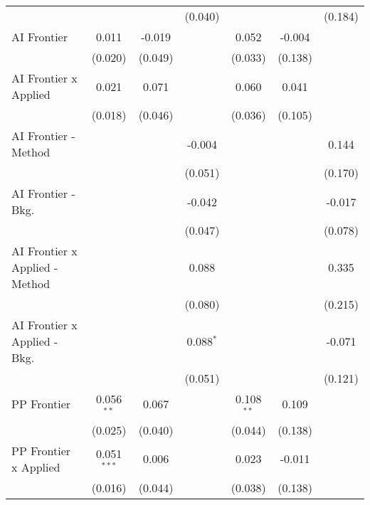 \begin{tabular}{lcccccc}
                                  &               &              & (0.040)     &              &         & (0.184)\\   
   AI Frontier                    & 0.011         & -0.019       &             & 0.052        & -0.004  &   \\   
                                  & (0.020)       & (0.049)      &             & (0.033)      & (0.138) &   \\   
   AI Frontier x Applied          & 0.021         & 0.071        &             & 0.060        & 0.041   &   \\   
                                  & (0.018)       & (0.046)      &             & (0.036)      & (0.105) &   \\   
   AI Frontier - Method           &               &              & -0.004      &              &         & 0.144\\   
                                  &               &              & (0.051)     &              &         & (0.170)\\   
   AI Frontier - Bkg.             &               &              & -0.042      &              &         & -0.017\\   
                                  &               &              & (0.047)     &              &         & (0.078)\\   
   AI Frontier x Applied - Method &               &              & 0.088       &              &         & 0.335\\   
                                  &               &              & (0.080)     &              &         & (0.215)\\   
   AI Frontier x Applied - Bkg.   &               &              & 0.088$^{*}$ &              &         & -0.071\\   
                                  &               &              & (0.051)     &              &         & (0.121)\\   
   PP Frontier                    & 0.056$^{**}$  & 0.067        &             & 0.108$^{**}$ & 0.109   &   \\   
                                  & (0.025)       & (0.040)      &             & (0.044)      & (0.138) &   \\   
   PP Frontier x Applied          & 0.051$^{***}$ & 0.006        &             & 0.023        & -0.011  &   \\   
                                  & (0.016)       & (0.044)      &             & (0.038)      & (0.138) &   \\   

\end{tabular}
